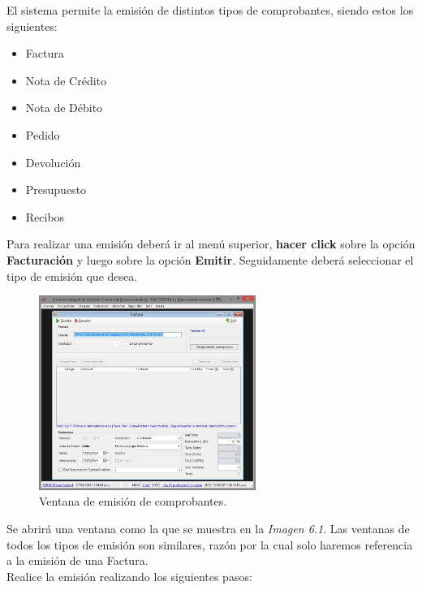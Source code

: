 \documentclass{book}
\begin{document}
El sistema permite la emisión de distintos tipos de comprobantes, siendo estos los siguientes:

\begin{itemize}
	\renewcommand{\labelitemi}{\scriptsize\tiny$\blacksquare$} 
	\itemsep=3pt \topsep=0pt \partopsep=0pt \parskip=0pt \parsep=0pt
	
	\item Factura
	\item Nota de Crédito
	\item Nota de Débito
	\item Pedido
	\item Devolución
	\item Presupuesto
	\item Recibos

\end{itemize}
\medskip

Para realizar una emisión deberá ir al menú superior, \textbf{hacer click} sobre la opción \textbf{Facturación} y luego sobre la opción \textbf{Emitir}. Seguidamente deberá seleccionar el tipo de emisión que desea. 
\smallskip

\begin{figure}[H]
	\centering
	\includegraphics[width=0.63\textwidth]{images/ventanas/ventana-09.jpg}
	\caption{Ventana de emisión de comprobantes.}
	\medskip
\end{figure}
\newpage

Se abrirá una ventana como la que se muestra en la \textit{Imagen 6.1}. Las ventanas de todos los tipos de emisión son similares, razón por la cual solo haremos referencia a la emisión de una Factura. \\
\indent Realice la emisión realizando los siguientes pasos:
\end{document}

